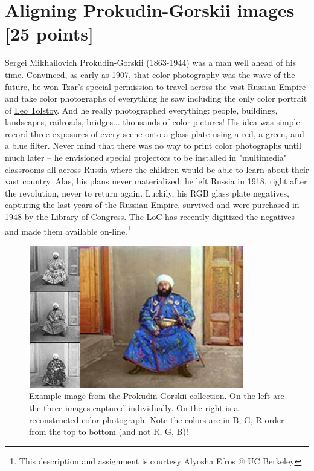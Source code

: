 \documentclass[10pt,letterpaper]{article}
\begin{document}
\newpage
\section{Aligning Prokudin-Gorskii images [25 points]} 
Sergei Mikhailovich Prokudin-Gorskii (1863-1944) was a man well ahead of his time. Convinced, as early as 1907, that color photography was the wave of the future, he won Tzar's special permission to travel across the vast Russian Empire and take color photographs of everything he saw including the only color portrait of \href{https://en.wikipedia.org/wiki/Leo_Tolstoy}{Leo Tolstoy}. And he really photographed everything: people, buildings, landscapes, railroads, bridges... thousands of color pictures! His idea was simple: record three exposures of every scene onto a glass plate using a red, a green, and a blue filter. Never mind that there was no way to print color photographs until much later -- he envisioned special projectors to be installed in "multimedia" classrooms all across Russia where the children would be able to learn about their vast country. Alas, his plans never materialized: he left Russia in 1918, right after the revolution, never to return again. Luckily, his RGB glass plate negatives, capturing the last years of the Russian Empire, survived and were purchased in 1948 by the Library of Congress. The LoC has recently digitized the negatives and made them available on-line.\footnote{This description and assignment is courtesy Alyosha Efros @ UC Berkeley }
\begin{figure}[h]
\centering
\includegraphics[width=0.65\linewidth]{example-Prokudin-Gorskii.png}
\caption{Example image from the Prokudin-Gorskii collection. On the left are the three images captured individually. On the right is a reconstructed color photograph. Note the colors are in B, G, R order from the top to bottom (and not R, G, B)!}
\end{figure}
\end{document}
